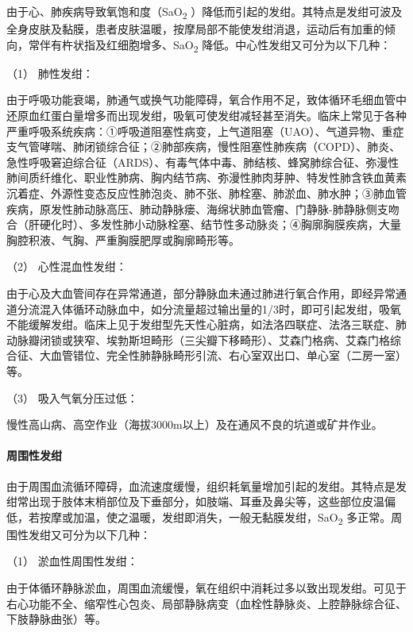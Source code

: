 由于心、肺疾病导致氧饱和度（SaO\textsubscript{2}
）降低而引起的发绀。其特点是发绀可波及全身皮肤及黏膜，患者皮肤温暖，按摩局部不能使发绀消退，运动后有加重的倾向，常伴有杵状指及红细胞增多、SaO\textsubscript{2}
降低。中心性发绀又可分为以下几种：

\hypertarget{text00041.htmlux5cux23CHP1-17-1-1-1-1}{}
（1） 肺性发绀：

由于呼吸功能衰竭，肺通气或换气功能障碍，氧合作用不足，致体循环毛细血管中还原血红蛋白量增多而出现发绀，吸氧可使发绀减轻甚至消失。临床上常见于各种严重呼吸系统疾病：①呼吸道阻塞性病变，上气道阻塞（UAO）、气道异物、重症支气管哮喘、肺闭锁综合征；②肺部疾病，慢性阻塞性肺疾病（COPD）、肺炎、急性呼吸窘迫综合征（ARDS）、有毒气体中毒、肺结核、蜂窝肺综合征、弥漫性肺间质纤维化、职业性肺病、胸内结节病、弥漫性肺肉芽肿、特发性肺含铁血黄素沉着症、外源性变态反应性肺泡炎、肺不张、肺栓塞、肺淤血、肺水肿；③肺血管疾病，原发性肺动脉高压、肺动静脉瘘、海绵状肺血管瘤、门静脉-肺静脉侧支吻合（肝硬化时）、多发性肺小动脉栓塞、结节性多动脉炎；④胸廓胸膜疾病，大量胸腔积液、气胸、严重胸膜肥厚或胸廓畸形等。

\hypertarget{text00041.htmlux5cux23CHP1-17-1-1-1-2}{}
（2） 心性混血性发绀：

由于心及大血管间存在异常通道，部分静脉血未通过肺进行氧合作用，即经异常通道分流混入体循环动脉血中，如分流量超过输出量的1/3时，即可引起发绀，吸氧不能缓解发绀。临床上见于发绀型先天性心脏病，如法洛四联症、法洛三联症、肺动脉瓣闭锁或狭窄、埃勃斯坦畸形（三尖瓣下移畸形）、艾森门格病、艾森门格综合征、大血管错位、完全性肺静脉畸形引流、右心室双出口、单心室（二房一室）等。

\hypertarget{text00041.htmlux5cux23CHP1-17-1-1-1-3}{}
（3） 吸入气氧分压过低：

慢性高山病、高空作业（海拔3000m以上）及在通风不良的坑道或矿井作业。

\paragraph{周围性发绀}

由于周围血流循环障碍，血流速度缓慢，组织耗氧量增加引起的发绀。其特点是发绀常出现于肢体末梢部位及下垂部分，如肢端、耳垂及鼻尖等，这些部位皮温偏低，若按摩或加温，使之温暖，发绀即消失，一般无黏膜发绀，SaO\textsubscript{2}
多正常。周围性发绀又可分为以下几种：

\hypertarget{text00041.htmlux5cux23CHP1-17-1-1-2-1}{}
（1） 淤血性周围性发绀：

由于体循环静脉淤血，周围血流缓慢，氧在组织中消耗过多以致出现发绀。可见于右心功能不全、缩窄性心包炎、局部静脉病变（血栓性静脉炎、上腔静脉综合征、下肢静脉曲张）等。

